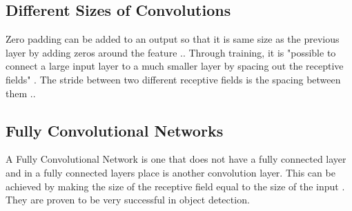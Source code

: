 \subsection*{Different Sizes of Convolutions}
Zero padding can be added to an output so that it is same size as the previous layer by adding zeros around the feature \textcite{handsOnML}..
Through training, it is "possible to connect a large input layer to a much smaller layer by spacing out the receptive fields" \textcite{handsOnML}.
The stride between two different receptive fields is the spacing between them \textcite{handsOnML}.. 

\subsection*{Fully Convolutional Networks}
A Fully Convolutional Network is one that does not have a fully connected layer
and in a fully connected layers place is another convolution layer.
This can be achieved by making the size of the receptive field equal to the size of the input \textcite{digits}.
They are proven to be very successful in object detection.